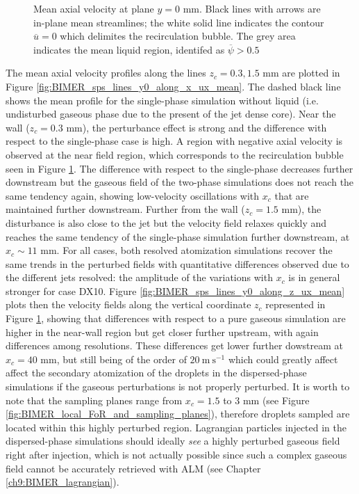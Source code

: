 \vspace*{-0.5in}


\begin{figure}[ht]
\centering
\caption[Mean axial velocity at plane $y = 0$ mm]{Mean axial velocity at plane $y = 0$ mm. Black lines with arrows are in-plane mean streamlines; the white solid line indicates the contour $\overline{u} = 0$ which delimites the recirculation bubble. The grey area indicates the mean liquid region, identifed as $\overline{\psi} > 0.5$}
\label{fig:BIMER_turbulent_structures_plane_y0}
\end{figure}


The mean axial velocity profiles along the lines $z_c = 0.3, 1.5$ mm are plotted in Figure \ref{fig:BIMER_sps_lines_y0_along_x_ux_mean}. The dashed black line shows the mean profile for the single-phase simulation without liquid (i.e. undisturbed gaseous phase due to the present of the jet dense core). Near the wall ($z_c = 0.3$ mm), the perturbance effect is strong and the difference with respect to the single-phase case is high. A region with negative axial velocity is observed at the near field region, which corresponds to the recirculation bubble seen in Figure \ref{fig:BIMER_turbulent_structures_plane_y0}. The difference with respect to the single-phase decreases further downstream but the gaseous field of the two-phase simulations does not reach the same tendency again, showing low-velocity oscillations with $x_c$ that are maintained further downstream. Further from the wall ($z_c = 1.5$ mm), the disturbance is also close to the jet but the velocity field relaxes quickly and reaches the same tendency of the single-phase simulation further downstream, at $x_c \sim 11$ mm. For all cases, both resolved atomization simulations recover the same trends in the perturbed fields with quantitative differences observed due to the different jets resolved: the amplitude of the variations with $x_c$ is in general stronger for case DX10. Figure \ref{fig:BIMER_sps_lines_y0_along_z_ux_mean} plots then the velocity fields along the vertical coordinate $z_c$ represented in Figure \ref{fig:BIMER_turbulent_structures_plane_y0}, showing that differences with respect to a pure gaseous simulation are higher in the near-wall region but get closer further upstream, with again differences among resolutions. These differences get lower further dowstream at $x_c = 40$ mm, but still being of the order of $20~\mathrm{m~s}^{-1}$ which could greatly affect affect the secondary atomization of the droplets in the dispersed-phase simulations if the gaseous perturbations is not properly perturbed. It is worth to note that the sampling planes range from $x_c = 1.5$ to $3$ mm (see Figure \ref{fig:BIMER_local_FoR_and_sampling_planes}), therefore droplets sampled are located within this highly perturbed region. Lagrangian particles injected in the dispersed-phase simulations should ideally \textsl{see} a highly perturbed gaseous field right after injection, which is not actually possible since such a complex gaseous field cannot be accurately retrieved with ALM (see Chapter \ref{ch9:BIMER_lagrangian}).

